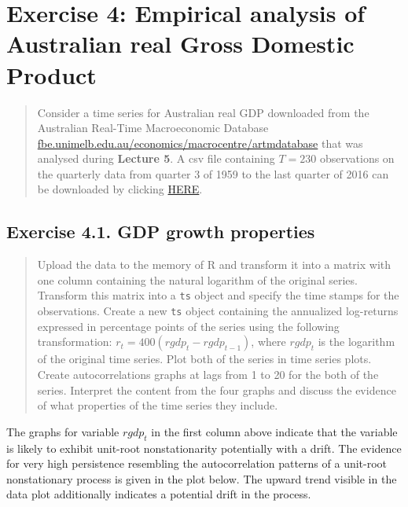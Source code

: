 \documentclass[
  letterpaper,
  DIV=11,
  numbers=noendperiod]{scrreprt}
\begin{document}
\hypertarget{exercise-4-empirical-analysis-of-australian-real-gross-domestic-product}{%
\section*{Exercise 4: Empirical analysis of Australian real Gross
Domestic
Product}\label{exercise-4-empirical-analysis-of-australian-real-gross-domestic-product}}

\begin{quote}
Consider a time series for Australian real GDP downloaded from the
Australian Real-Time Macroeconomic Database
\href{http://fbe.unimelb.edu.au/economics/macrocentre/artmdatabase}{fbe.unimelb.edu.au/economics/macrocentre/artmdatabase}
that was analysed during \textbf{Lecture 5}. A csv file containing
\(T=230\) observations on the quarterly data from quarter 3 of 1959 to
the last quarter of 2016 can be downloaded by clicking
\href{https://unimelbcloud-my.sharepoint.com/:x:/g/personal/tomasz_wozniak_unimelb_edu_au/EUGgK79jyPBLoglnoVq75lEBI5k7TB7bEXFCemLDWnqyCg?e=9C8wHr}{HERE}.
\end{quote}

\hypertarget{exercise-4.1.-gdp-growth-properties}{%
\subsection*{Exercise 4.1. GDP growth
properties}\label{exercise-4.1.-gdp-growth-properties}}

\begin{quote}
Upload the data to the memory of R and transform it into a matrix with
one column containing the natural logarithm of the original series.
Transform this matrix into a \texttt{ts} object and specify the time
stamps for the observations. Create a new \texttt{ts} object containing
the annualized log-returns expressed in percentage points of the series
using the following transformation: \(r_t = 400(rgdp_t - rgdp_{t-1})\),
where \(rgdp_t\) is the logarithm of the original time series. Plot both
of the series in time series plots. Create autocorrelations graphs at
lags from 1 to 20 for the both of the series. Interpret the content from
the four graphs and discuss the evidence of what properties of the time
series they include.
\end{quote}

The graphs for variable \(rgdp_t\) in the first column above indicate
that the variable is likely to exhibit unit-root nonstationarity
potentially with a drift. The evidence for very high persistence
resembling the autocorrelation patterns of a unit-root nonstationary
process is given in the plot below. The upward trend visible in the data
plot additionally indicates a potential drift in the process.
\end{document}
